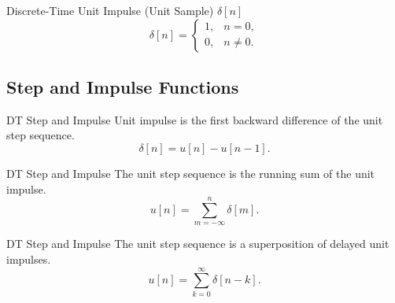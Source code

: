 \begin{frame}[plain]{Discrete-Time Unit Impulse (Unit Sample) $\delta[n]$}
    \begin{equation}
        \delta[n] = \begin{cases}
                 1, & n = 0,\\
                 0, & n \neq 0.
               \end{cases}
    \end{equation}
    {
        {
            \centering
            
        }
    }
\end{frame}


\subsection{Step and Impulse Functions}
\begin{frame}[plain]{DT Step and Impulse}
    Unit impulse is the first backward difference of the unit step sequence.
    \begin{equation}
        \delta[n] = u[n] - u[n-1].
    \end{equation}
    {
        \vspace{1in}
    }

    {
        {
            \centering
            
        }
    }
\end{frame}

\begin{frame}[plain]{DT Step and Impulse}
    The unit step sequence is the running sum of the unit impulse.
    \begin{equation}
        u[n] = \sum_{m=-\infty}^{n}\delta[m].
    \end{equation}
    {
        \vspace{1in}
    }
    \pause
    {
        {
            \centering
            
        }
    }
\end{frame}




\begin{frame}[plain]{DT Step and Impulse}
    The unit step sequence is a superposition of delayed unit impulses.
    \begin{equation}
        u[n] = \sum_{k=0}^{\infty}\delta[n-k].
    \end{equation}
    {
        \vspace{1in}
    }
    \pause
    {
        {
            \centering
            
        }
    }
\end{frame}





